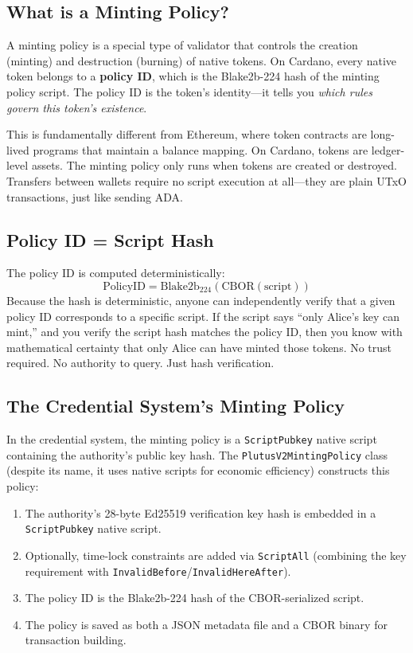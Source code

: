 \subsection{What is a Minting Policy?}

A minting policy is a special type of validator that controls the
creation (minting) and destruction (burning) of native tokens. On
Cardano, every native token belongs to a \textbf{policy ID}, which is
the Blake2b-224 hash of the minting policy script. The policy ID is
the token's identity---it tells you \emph{which rules govern this
token's existence}.

This is fundamentally different from Ethereum, where token contracts
are long-lived programs that maintain a balance mapping. On Cardano,
tokens are ledger-level assets. The minting policy only runs when
tokens are created or destroyed. Transfers between wallets require no
script execution at all---they are plain UTxO transactions, just like
sending ADA.

\subsection{Policy ID = Script Hash}

The policy ID is computed deterministically:
\[
  \mathrm{PolicyID} = \mathrm{Blake2b}_{224}(\mathrm{CBOR}(\mathrm{script}))
\]
Because the hash is deterministic, anyone can independently verify that
a given policy ID corresponds to a specific script. If the script says
``only Alice's key can mint,'' and you verify the script hash matches
the policy ID, then you know with mathematical certainty that only
Alice can have minted those tokens. No trust required. No authority to
query. Just hash verification.

\subsection{The Credential System's Minting Policy}

In the credential system, the minting policy is a \texttt{ScriptPubkey}
native script containing the authority's public key hash. The
\texttt{PlutusV2MintingPolicy} class (despite its name, it uses native
scripts for economic efficiency) constructs this policy:

\begin{enumerate}[nosep]
  \item The authority's 28-byte Ed25519 verification key hash is
    embedded in a \texttt{ScriptPubkey} native script.
  \item Optionally, time-lock constraints are added via
    \texttt{ScriptAll} (combining the key requirement with
    \texttt{InvalidBefore}/\texttt{InvalidHereAfter}).
  \item The policy ID is the Blake2b-224 hash of the CBOR-serialized
    script.
  \item The policy is saved as both a JSON metadata file and a CBOR
    binary for transaction building.
\end{enumerate}

